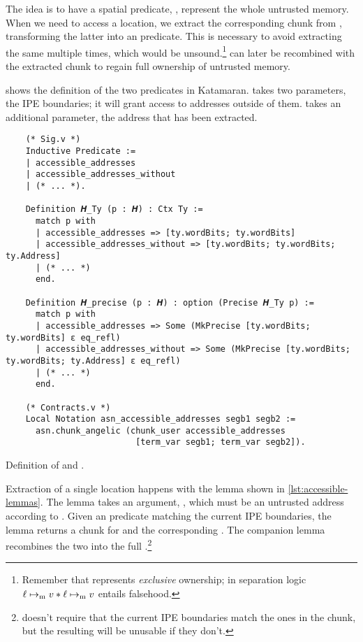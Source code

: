 The idea is to have a spatial predicate, , represent the whole untrusted memory. When we need to access a location, we extract the corresponding  chunk from , transforming the latter into an \linebreak {} predicate. This is necessary to avoid extracting the same  multiple times, which would be unsound.\footnote{Remember that  represents \emph{exclusive} ownership; in separation logic \(\ell \mapsto_{\mathrm{m}} v \ast \ell \mapsto_{\mathrm{m}} v\) entails falsehood.}  can later be recombined with the extracted chunk to regain full ownership of untrusted memory.

 shows the definition of the two predicates in Katamaran.  takes two parameters, the IPE boundaries; it will grant access to addresses outside of them.  takes an additional parameter, the address that has been extracted. %

\begin{listing}
  \begin{verbatim}
    (* Sig.v *)
    Inductive Predicate :=
    | accessible_addresses
    | accessible_addresses_without
    | (* ... *).

    Definition 𝑯_Ty (p : 𝑯) : Ctx Ty :=
      match p with
      | accessible_addresses => [ty.wordBits; ty.wordBits]
      | accessible_addresses_without => [ty.wordBits; ty.wordBits; ty.Address]
      | (* ... *)
      end.

    Definition 𝑯_precise (p : 𝑯) : option (Precise 𝑯_Ty p) :=
      match p with
      | accessible_addresses => Some (MkPrecise [ty.wordBits; ty.wordBits] ε eq_refl)
      | accessible_addresses_without => Some (MkPrecise [ty.wordBits; ty.wordBits; ty.Address] ε eq_refl)
      | (* ... *)
      end.

    (* Contracts.v *)
    Local Notation asn_accessible_addresses segb1 segb2 :=
      asn.chunk_angelic (chunk_user accessible_addresses
                          [term_var segb1; term_var segb2]).
  \end{verbatim}
  \caption{Definition of  and .}
  \label{lst:accessible_addresses}
\end{listing}

Extraction of a single location happens with the  lemma shown in \cref{lst:accessible-lemmas}. The lemma takes an argument, , which must be an untrusted address according to . Given an  predicate matching the current IPE boundaries, the lemma returns a  chunk for  and the corresponding . The companion lemma  recombines the two into the full .\footnote{ doesn't require that the current IPE boundaries match the ones in the  chunk, but the resulting  will be unusable if they don't.}

